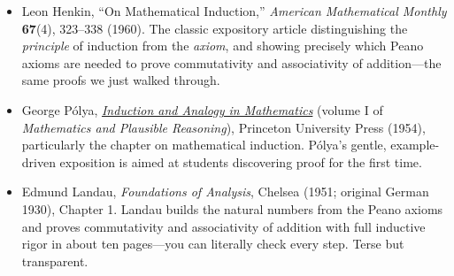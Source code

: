 \documentclass[11pt]{article}
\begin{document}
\begin{itemize}
  \item Leon Henkin, ``On Mathematical Induction,'' \emph{American Mathematical Monthly} \textbf{67}(4), 323--338 (1960). The classic expository article distinguishing the \emph{principle} of induction from the \emph{axiom}, and showing precisely which Peano axioms are needed to prove commutativity and associativity of addition---the same proofs we just walked through.
  \item George P\'olya, \emph{\href{https://press.princeton.edu/books/paperback/9780691025094/mathematics-and-plausible-reasoning-volume-1}{Induction and Analogy in Mathematics}} (volume I of \emph{Mathematics and Plausible Reasoning}), Princeton University Press (1954), particularly the chapter on mathematical induction. P\'olya's gentle, example-driven exposition is aimed at students discovering proof for the first time.
  \item Edmund Landau, \emph{Foundations of Analysis}, Chelsea (1951; original German 1930), Chapter 1. Landau builds the natural numbers from the Peano axioms and proves commutativity and associativity of addition with full inductive rigor in about ten pages---you can literally check every step. Terse but transparent.
\end{itemize}
\end{document}
